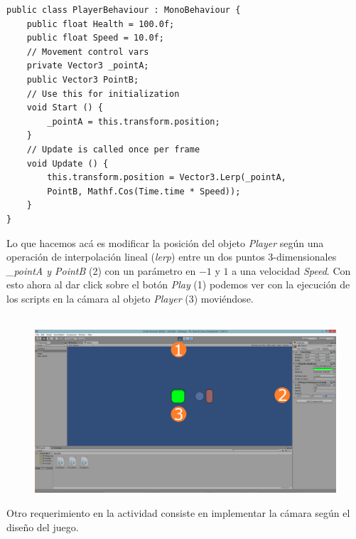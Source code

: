 \begin{lstlisting}
public class PlayerBehaviour : MonoBehaviour {
	public float Health = 100.0f;
	public float Speed = 10.0f;
	// Movement control vars
	private Vector3 _pointA;
	public Vector3 PointB;
	// Use this for initialization
	void Start () {
		_pointA = this.transform.position;
	}
	// Update is called once per frame
	void Update () {
		this.transform.position = Vector3.Lerp(_pointA, 
		PointB, Mathf.Cos(Time.time * Speed));
	}
}
\end{lstlisting}

Lo que hacemos acá es modificar la posición del objeto \emph{Player} según una operación de interpolación lineal (\emph{lerp}) entre un dos puntos 3-dimensionales \emph{\_pointA y PointB} (2) con un parámetro en $-1$ y $1$ a una velocidad \emph{Speed}. Con esto ahora al dar click sobre el botón \emph{Play} (1) podemos ver con la ejecución de los scripts en la cámara al objeto \emph{Player} (3) moviéndose.\\~

\begin{figure}[H]
\centering
\includegraphics[width=0.80\linewidth]{media/1_ss8.jpg} 
\label{fig:unity_8}
\end{figure}

Otro requerimiento en la actividad consiste en implementar la cámara según el diseño del juego.

